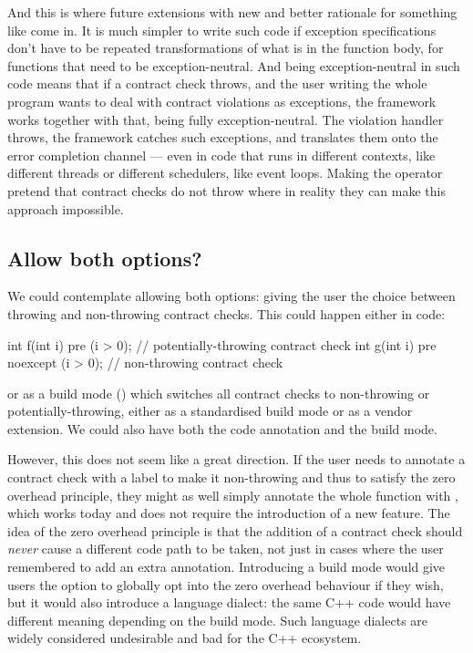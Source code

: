 And this is where future extensions with new and better rationale for something like  come in. It is much simpler to write such code if exception specifications don’t have to be repeated transformations of what is in the function body, for functions that need to be exception-neutral. And being exception-neutral in such code means that if a contract check throws, and the user writing the whole program wants to deal with contract violations as exceptions, the framework works together with that, being fully exception-neutral. The violation handler throws, the framework catches such exceptions, and translates them onto the error completion channel --- even in code that runs in different contexts, like different threads or different schedulers, like event loops. Making the  operator pretend that contract checks do not throw where in reality they can make this approach impossible.

\subsection{Allow both options?}

We could contemplate allowing both options: giving the user the choice between throwing and non-throwing contract checks. This could happen either in code:

\begin{codeblock}
int f(int i)
  pre (i > 0);  // potentially-throwing contract check
int g(int i)
  pre noexcept (i > 0);  // non-throwing contract check
\end{codeblock}

or as a build mode () which switches all contract checks to non-throwing or potentially-throwing, either as a standardised build mode or as a vendor extension. We could also have both the code annotation and the build mode.

However, this does not seem like a great direction. If the user needs to annotate a contract check with a  label to make it non-throwing and thus to satisfy the zero overhead principle, they might as well simply annotate the whole function with , which works today and does not require the introduction of a new feature. The idea of the zero overhead principle is that the addition of a contract check should \emph{never} cause a different code path to be taken, not just in cases where the user remembered to add an extra annotation. Introducing a build mode would give users the option to globally opt into the zero overhead behaviour if they wish, but it would also introduce a language dialect: the same C++ code would have different meaning depending on the build mode. Such language dialects are widely considered undesirable and bad for the C++ ecosystem.

